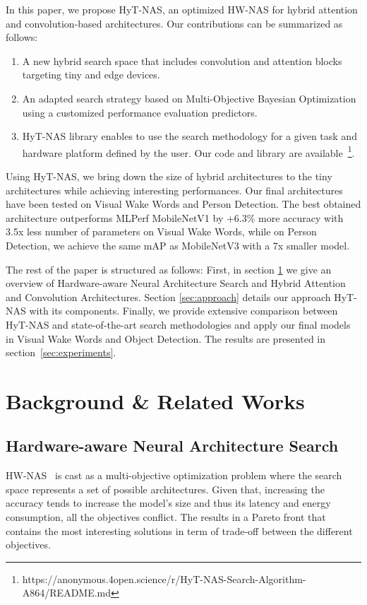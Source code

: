 \documentclass[conference]{IEEEtran}
\begin{document}
In this paper, we propose HyT-NAS, an optimized HW-NAS for hybrid attention and convolution-based architectures. 
Our contributions can be summarized as follows:
\begin{enumerate}
    \item A new hybrid search space that includes convolution and attention blocks targeting tiny and edge devices. 
    \item An adapted search strategy based on Multi-Objective Bayesian Optimization using a customized performance evaluation predictors. 
    \item HyT-NAS library enables to use the search methodology for a given task and hardware platform defined by the user. Our code and library are available~\footnote{https://anonymous.4open.science/r/HyT-NAS-Search-Algorithm-A864/README.md}.  
\end{enumerate}
Using HyT-NAS, we bring down the size of hybrid architectures to the tiny architectures while achieving interesting performances. 
Our final architectures have been tested on Visual Wake Words and Person Detection. The best obtained architecture outperforms MLPerf MobileNetV1 by +6.3\% more accuracy with 3.5x less number of parameters on Visual Wake Words, while on Person Detection, we achieve the same mAP as MobileNetV3 with a 7x smaller model.

The rest of the paper is structured as follows: First, in section \ref{sec:related_works} we give an overview of Hardware-aware Neural Architecture Search and Hybrid Attention and Convolution Architectures. 
Section \ref{sec:approach} details our approach HyT-NAS with its components. 
Finally, we provide extensive comparison between HyT-NAS and state-of-the-art search methodologies and apply our final models in Visual Wake Words and Object Detection. The results are presented in section~\ref{sec:experiments}.  

 
\section{Background \& Related Works}
\label{sec:related_works}


\subsection{Hardware-aware Neural Architecture Search}
HW-NAS~\cite{survey} is cast as a multi-objective optimization problem where the search space represents a set of possible architectures. Given that, increasing the accuracy tends to increase the model's size and thus its latency and energy consumption, all the objectives conflict. The results in a Pareto front that contains the most interesting solutions in term of trade-off between the different objectives.
\end{document}
